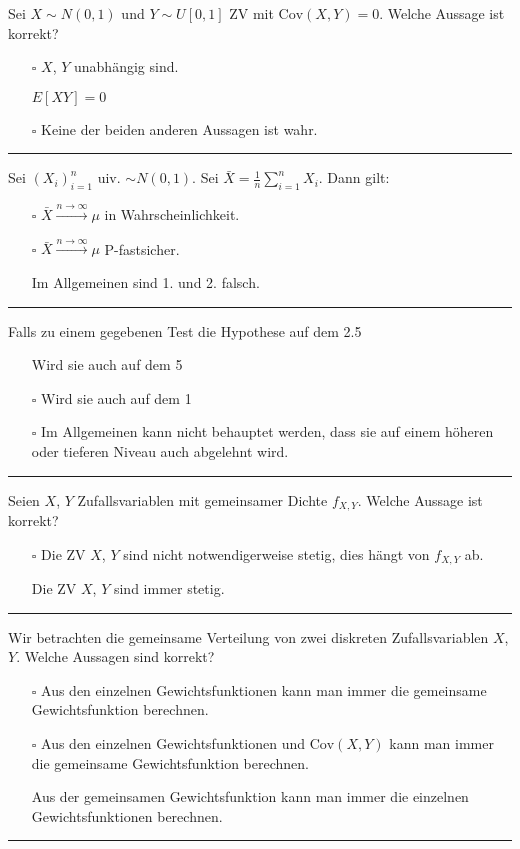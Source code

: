\begin{tiny}
    Sei $X \sim N(0, 1)$ und $Y \sim U[0, 1]$ ZV mit $\text{Cov}(X, Y) = 0$. Welche Aussage ist korrekt?
    \begin{itemize}
        \item[$\square$] $X$, $Y$ unabhängig sind.
        \item[\checkmark] $E[XY] = 0$
        \item[$\square$] Keine der beiden anderen Aussagen ist wahr.
    \end{itemize}
    \rule{\linewidth}{0.4pt}

    Sei $(X_i)_{i=1}^n$ uiv. $\sim N(0, 1)$. Sei $\bar{X} = \frac{1}{n} \sum_{i=1}^{n} X_i$. Dann gilt:
    \begin{itemize}
        \item[$\square$] $\bar{X} \overset{n \to \infty}{\longrightarrow} \mu$ in Wahrscheinlichkeit.
        \item[$\square$] $\bar{X} \overset{n \to \infty}{\longrightarrow} \mu$ P-fastsicher.
        \item[\checkmark] Im Allgemeinen sind 1. und 2. falsch.
    \end{itemize}
    \rule{\linewidth}{0.4pt}

    Falls zu einem gegebenen Test die Hypothese auf dem 2.5%
    \begin{itemize}
        \item[\checkmark] Wird sie auch auf dem 5%
        \item[$\square$] Wird sie auch auf dem 1%
        \item[$\square$] Im Allgemeinen kann nicht behauptet werden, dass sie auf einem höheren oder tieferen Niveau auch abgelehnt wird.
    \end{itemize}
    \rule{\linewidth}{0.4pt}

    Seien $X$, $Y$ Zufallsvariablen mit gemeinsamer Dichte $f_{X,Y}$. Welche Aussage ist korrekt?
    \begin{itemize}
        \item[$\square$] Die ZV $X$, $Y$ sind nicht notwendigerweise stetig, dies hängt von $f_{X,Y}$ ab.
        \item[\checkmark] Die ZV $X$, $Y$ sind immer stetig.
    \end{itemize}
    \rule{\linewidth}{0.4pt}

    Wir betrachten die gemeinsame Verteilung von zwei diskreten Zufallsvariablen $X$, $Y$. Welche Aussagen sind korrekt?
    \begin{itemize}
        \item[$\square$] Aus den einzelnen Gewichtsfunktionen kann man immer die gemeinsame Gewichtsfunktion berechnen.
        \item[$\square$] Aus den einzelnen Gewichtsfunktionen und $\text{Cov}(X, Y)$ kann man immer die gemeinsame Gewichtsfunktion berechnen.
        \item[\checkmark] Aus der gemeinsamen Gewichtsfunktion kann man immer die einzelnen Gewichtsfunktionen berechnen.
    \end{itemize}
    \rule{\linewidth}{0.4pt}


\end{tiny}

